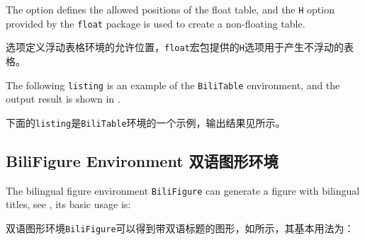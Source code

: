 \begin{ParaColumn}

    The  option defines the allowed positions of the float table, and the \verb"H" option provided by the \verb"float" package is used to create a non-floating table.

    \switchcolumn

    选项定义浮动表格环境的允许位置，\verb"float"宏包提供的\verb"H"选项用于产生不浮动的表格。

\end{ParaColumn}

\begin{ParaColumn}

    The following \verb"listing" is an example of the \verb"BiliTable" environment, and the output result is shown in .

    \switchcolumn

    下面的\verb"listing"是\verb"BiliTable"环境的一个示例，输出结果见所示。

\end{ParaColumn}



\subsection{BiliFigure Environment 双语图形环境}

\begin{ParaColumn}

    The bilingual figure environment \verb"BiliFigure" can generate a figure with bilingual titles, see , its basic usage is:
    
    \switchcolumn

    双语图形环境\verb"BiliFigure"可以得到带双语标题的图形，如所示，其基本用法为：

\end{ParaColumn}



